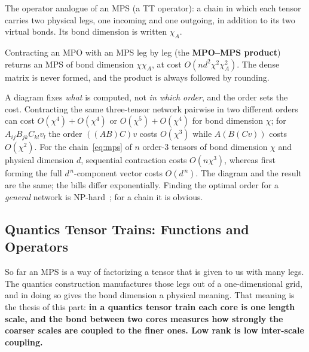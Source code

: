 \begin{definition}
  The operator analogue of an MPS (a TT operator): a chain in which each tensor
  carries two physical legs, one incoming and one outgoing, in addition to its
  two virtual bonds. Its bond dimension is written $\chi_A$.
\end{definition}

Contracting an MPO with an MPS leg by leg (the \textbf{MPO--MPS product})
returns an MPS of bond dimension $\chi\chi_A$, at cost
$O(n d^2 \chi^2 \chi_A^2)$. The dense matrix is never formed, and the product is
always followed by rounding.

\begin{remark}
  A diagram fixes \emph{what} is computed, not \emph{in which order}, and the
  order sets the cost. Contracting the same three-tensor network pairwise in two
  different orders can cost $O(\chi^4)+O(\chi^4)$ or $O(\chi^5)+O(\chi^4)$ for
  bond dimension $\chi$; for $A_{ij}B_{jk}C_{kl}v_l$ the order $((AB)C)v$ costs
  $O(\chi^3)$ while $A(B(Cv))$ costs $O(\chi^2)$. For the chain~\eqref{eq:mps}
  of $n$ order-3 tensors of bond dimension $\chi$ and physical dimension $d$,
  sequential contraction costs $O(n \chi^3)$, whereas first forming the full
  $d^{\,n}$-component vector costs $O(d^{\,n})$. The diagram and the result are
  the same; the bills differ exponentially. Finding the optimal order for a
  \emph{general} network is NP-hard~\cite{Gray2021}; for a chain it is obvious.
\end{remark}

\subsection{Quantics Tensor Trains: Functions and Operators}
\label{subsec:qtt-functions-operators}

So far an MPS is a way of factorizing a tensor that is given to us with many
legs. The quantics construction manufactures those legs out of a
one-dimensional grid, and in doing so gives the bond dimension a physical
meaning. That meaning is the thesis of this part: \textbf{in a quantics tensor
train each core is one length scale, and the bond between two cores measures
how strongly the coarser scales are coupled to the finer ones. Low rank is low
inter-scale coupling.}

